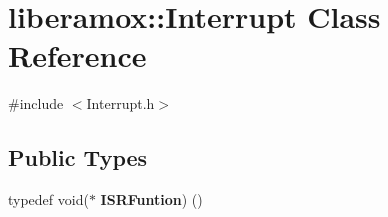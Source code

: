 \hypertarget{classliberamox_1_1Interrupt}{}\section{liberamox\+:\+:Interrupt Class Reference}
\label{classliberamox_1_1Interrupt}


{\ttfamily \#include $<$Interrupt.\+h$>$}

\subsection*{Public Types}
\begin{DoxyCompactItemize}
\item 
typedef void($\ast$ {\bfseries I\+S\+R\+Funtion}) ()\hypertarget{classliberamox_1_1Interrupt_afd675f33f9feb88ba280b01a794911c9}{}\label{classliberamox_1_1Interrupt_afd675f33f9feb88ba280b01a794911c9}

\end{DoxyCompactItemize}
